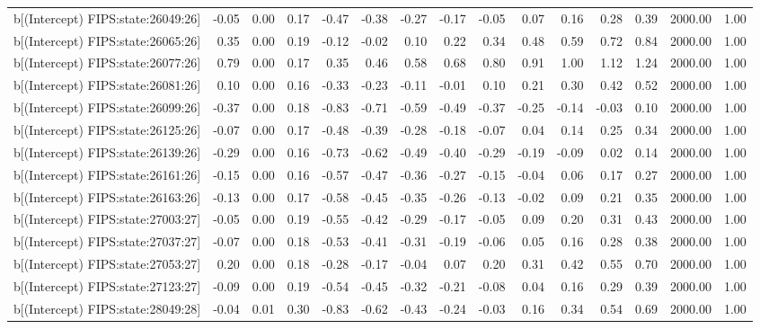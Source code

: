 \begin{table}[ht]
\begin{tabular}{rrrrrrrrrrrrrrr}
  b[(Intercept) FIPS:state:26049:26] & -0.05 & 0.00 & 0.17 & -0.47 & -0.38 & -0.27 & -0.17 & -0.05 & 0.07 & 0.16 & 0.28 & 0.39 & 2000.00 & 1.00 \\ 
  b[(Intercept) FIPS:state:26065:26] & 0.35 & 0.00 & 0.19 & -0.12 & -0.02 & 0.10 & 0.22 & 0.34 & 0.48 & 0.59 & 0.72 & 0.84 & 2000.00 & 1.00 \\ 
  b[(Intercept) FIPS:state:26077:26] & 0.79 & 0.00 & 0.17 & 0.35 & 0.46 & 0.58 & 0.68 & 0.80 & 0.91 & 1.00 & 1.12 & 1.24 & 2000.00 & 1.00 \\ 
  b[(Intercept) FIPS:state:26081:26] & 0.10 & 0.00 & 0.16 & -0.33 & -0.23 & -0.11 & -0.01 & 0.10 & 0.21 & 0.30 & 0.42 & 0.52 & 2000.00 & 1.00 \\ 
  b[(Intercept) FIPS:state:26099:26] & -0.37 & 0.00 & 0.18 & -0.83 & -0.71 & -0.59 & -0.49 & -0.37 & -0.25 & -0.14 & -0.03 & 0.10 & 2000.00 & 1.00 \\ 
  b[(Intercept) FIPS:state:26125:26] & -0.07 & 0.00 & 0.17 & -0.48 & -0.39 & -0.28 & -0.18 & -0.07 & 0.04 & 0.14 & 0.25 & 0.34 & 2000.00 & 1.00 \\ 
  b[(Intercept) FIPS:state:26139:26] & -0.29 & 0.00 & 0.16 & -0.73 & -0.62 & -0.49 & -0.40 & -0.29 & -0.19 & -0.09 & 0.02 & 0.14 & 2000.00 & 1.00 \\ 
  b[(Intercept) FIPS:state:26161:26] & -0.15 & 0.00 & 0.16 & -0.57 & -0.47 & -0.36 & -0.27 & -0.15 & -0.04 & 0.06 & 0.17 & 0.27 & 2000.00 & 1.00 \\ 
  b[(Intercept) FIPS:state:26163:26] & -0.13 & 0.00 & 0.17 & -0.58 & -0.45 & -0.35 & -0.26 & -0.13 & -0.02 & 0.09 & 0.21 & 0.35 & 2000.00 & 1.00 \\ 
  b[(Intercept) FIPS:state:27003:27] & -0.05 & 0.00 & 0.19 & -0.55 & -0.42 & -0.29 & -0.17 & -0.05 & 0.09 & 0.20 & 0.31 & 0.43 & 2000.00 & 1.00 \\ 
  b[(Intercept) FIPS:state:27037:27] & -0.07 & 0.00 & 0.18 & -0.53 & -0.41 & -0.31 & -0.19 & -0.06 & 0.05 & 0.16 & 0.28 & 0.38 & 2000.00 & 1.00 \\ 
  b[(Intercept) FIPS:state:27053:27] & 0.20 & 0.00 & 0.18 & -0.28 & -0.17 & -0.04 & 0.07 & 0.20 & 0.31 & 0.42 & 0.55 & 0.70 & 2000.00 & 1.00 \\ 
  b[(Intercept) FIPS:state:27123:27] & -0.09 & 0.00 & 0.19 & -0.54 & -0.45 & -0.32 & -0.21 & -0.08 & 0.04 & 0.16 & 0.29 & 0.39 & 2000.00 & 1.00 \\ 
  b[(Intercept) FIPS:state:28049:28] & -0.04 & 0.01 & 0.30 & -0.83 & -0.62 & -0.43 & -0.24 & -0.03 & 0.16 & 0.34 & 0.54 & 0.69 & 2000.00 & 1.00 \\ 

\end{tabular}
\end{table}

